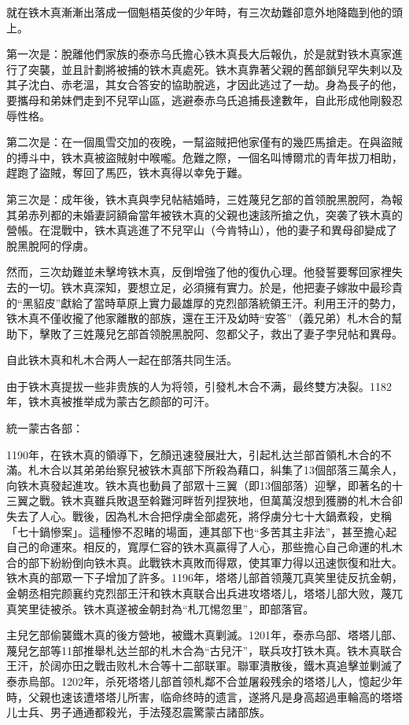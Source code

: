就在铁木真漸漸出落成一個魁梧英俊的少年時，有三次劫難卻意外地降臨到他的頭上。

第一次是：脫離他們家族的泰赤乌氏擔心铁木真長大后報仇，於是就對铁木真家進行了突襲，並且計劃將被捕的铁木真處死。铁木真靠著父親的舊部鎖兒罕失剌以及其子沈白、赤老溫，其女合答安的協助脫逃，才因此逃过了一劫。身為長子的他，要攜母和弟妹們走到不兒罕山區，逃避泰赤乌氏追捕長達數年，自此形成他剛毅忍辱性格。

第二次是：在一個風雪交加的夜晚，一幫盜賊把他家僅有的幾匹馬搶走。在與盜賊的搏斗中，铁木真被盜賊射中喉嚨。危難之際，一個名叫博爾朮的青年拔刀相助，趕跑了盜賊，奪回了馬匹，铁木真得以幸免于難。

第三次是：成年後，铁木真與孛兒帖結婚時，三姓蔑兒乞部的首领脫黑脫阿，為報其弟赤列都的未婚妻訶額侖當年被铁木真的父親也速該所搶之仇，突袭了铁木真的營帳。在混戰中，铁木真逃進了不兒罕山（今肯特山），他的妻子和異母卻變成了脫黑脫阿的俘虜。

然而，三次劫難並未擊垮铁木真，反倒增強了他的復仇心理。他發誓要奪回家裡失去的一切。铁木真深知，要想立足，必須擁有實力。於是，他把妻子嫁妝中最珍貴的“黑貂皮”獻給了當時草原上實力最雄厚的克烈部落統領王汗。利用王汗的勢力，铁木真不僅收攏了他家離散的部族，還在王汗及幼時“安答”（義兄弟）札木合的幫助下，擊敗了三姓蔑兒乞部首领脫黑脫阿、忽都父子，救出了妻子孛兒帖和異母。

自此铁木真和札木合两人一起在部落共同生活。

由于铁木真提拔一些非贵族的人为将领，引發札木合不满，最终雙方决裂。1182年，铁木真被推举成为蒙古乞颜部的可汗。

統一蒙古各部：

1190年，在铁木真的領導下，乞顏迅速發展壯大，引起札达兰部首領札木合的不滿。札木合以其弟弟绐察兒被铁木真部下所殺為藉口，糾集了13個部落三萬余人，向铁木真發起進攻。铁木真也動員了部眾十三翼（即13個部落）迎擊，即著名的十三翼之戰。铁木真雖兵敗退至斡難河畔哲列捏狹地，但萬萬沒想到獲勝的札木合卻失去了人心。戰後，因為札木合把俘虜全部處死，將俘虜分七十大鍋煮殺，史稱「七十鍋慘案」。這種慘不忍睹的場面，連其部下也“多苦其主非法”，甚至擔心起自己的命運來。相反的，寬厚仁容的铁木真贏得了人心，那些擔心自己命運的札木合的部下紛紛倒向铁木真。此戰铁木真敗而得眾，使其軍力得以迅速恢復和壯大。铁木真的部眾一下子增加了許多。1196年，塔塔儿部首领蔑兀真笑里徒反抗金朝，金朝丞相完颜襄约克烈部王汗和铁木真联合出兵进攻塔塔儿，塔塔儿部大败，蔑兀真笑里徒被杀。铁木真遂被金朝封為“札兀惕忽里”，即部落官。

主兒乞部偷襲鐵木真的後方營地，被鐵木真剿滅。1201年，泰赤乌部、塔塔儿部、蔑兒乞部等11部推舉札达兰部的札木合為“古兒汗”，联兵攻打铁木真。铁木真联合王汗，於阔亦田之戰击败札木合等十二部联軍。聯軍潰散後，鐵木真追擊並剿滅了泰赤烏部。1202年，杀死塔塔儿部首领札鄰不合並屠殺残余的塔塔儿人，憶起少年時，父親也速该遭塔塔儿所害，临命终時的遗言，遂將凡是身高超過車輪高的塔塔儿士兵、男子通通都殺光，手法殘忍震驚蒙古諸部族。

